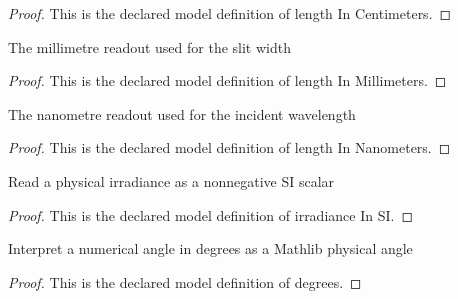 \begin{proof}
  This is the declared model definition of length In Centimeters.
\end{proof}
\begin{definition}
  \label{def:physics:phyx-mini-0126:phyxminiproblems-problemphyxmini0126-lengthinmillimeters}
  The millimetre readout used for the slit width
\end{definition}
\begin{proof}
  This is the declared model definition of length In Millimeters.
\end{proof}
\begin{definition}
  \label{def:physics:phyx-mini-0126:phyxminiproblems-problemphyxmini0126-lengthinnanometers}
  The nanometre readout used for the incident wavelength
\end{definition}
\begin{proof}
  This is the declared model definition of length In Nanometers.
\end{proof}
\begin{definition}[irradiance In SI]
  \label{def:physics:phyx-mini-0126:phyxminiproblems-problemphyxmini0126-irradianceinsi}
  Read a physical irradiance as a nonnegative SI scalar
\end{definition}
\begin{proof}
  This is the declared model definition of irradiance In SI.
\end{proof}
\begin{definition}[degrees]
  \label{def:physics:phyx-mini-0126:phyxminiproblems-problemphyxmini0126-degrees}
  Interpret a numerical angle in degrees as a Mathlib physical angle
\end{definition}
\begin{proof}
  This is the declared model definition of degrees.
\end{proof}
